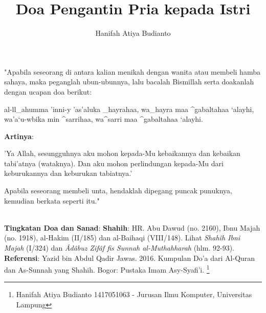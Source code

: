 \documentclass[a4paper,12pt]{article}
\title{\Large Doa Pengantin Pria kepada Istri}
\author{\calligra Hanifah Atiya Budianto}
\begin{document}
\sffamily
\maketitle 
\fullvocalize
{}
\par
\indent
"Apabila seseorang di antara kalian menikah dengan wanita atau membeli 
hamba sahaya, maka peganglah ubun-ubunnya, lalu bacalah Bismillah serta 
doakanlah dengan ucapan doa berikut:\\
\begin{arabtext}
\noindent
al-ll_ahumma 'inni-y 'as'aluka _hayrahaa, wa_hayra maa ^gabaltahaa `alayhi, 
wa'a`u-wbika min ^sarrihaa, wa^sarri maa ^gabaltahaa `alayhi.\\
\end{arabtext}
\noindent
\textbf{Artinya}:
\par
\indent
'Ya Allah, sesungguhnya aku mohon kepada-Mu kebaikannya dan kebaikan 
tabi'atnya (wataknya). Dan aku mohon perlindungan kepada-Mu dari 
keburukannya dan keburukan tabiatnya.'\\
\par
\indent
Apabila seseorang membeli unta, hendaklah dipegang puncak punuknya, 
kemudian berkata seperti itu."\\\\
\par
\noindent
\textbf{Tingkatan Doa dan Sanad}: \textbf{Shahih}: HR. Abu Dawud (no. 
2160), Ibnu Majah (no. 1918), al-Hakim (II/185) dan al-Baihaqi (VIII/148). 
Lihat \textit{Shah\^{i}h Ibni Majah} (I/324) dan \textit{\^{A}d\^{a}buz 
Zif\^{a}f fis Sunnah al-Muthahharah} (hlm. 92-93).\\
\textbf{Referensi}: Yazid bin Abdul Qadir Jawas. 2016. Kumpulan Do'a dari
Al-Quran dan As-Sunnah yang Shahih. Bogor: Pustaka Imam Asy-Syafi'i.
\footnote{Hanifah Atiya Budianto 1417051063 - Jurusan Ilmu Komputer,
Universitas Lampung}
\end{document}
